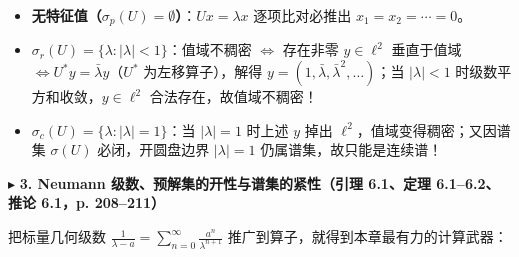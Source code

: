 \documentclass[11pt,a4paper]{article}
\providecommand{\tightlist}{\setlength{\itemsep}{1.8pt}\setlength{\parskip}{0pt}}
\newcommand{\SubSubHeading}[1]{%
  \Needspace{6.5\baselineskip}\vspace{5.5pt}\noindent
  \textcolor{AccentMain}{\scriptsize$\blacktriangleright$}\hspace{4pt}%
  {\small\bfseries\color{AccentMain}#1}\par\nopagebreak[4]\vspace{2.5pt}%
}
\begin{document}
\begin{enumerate}
  \begin{itemize}
  \tightlist
  \item
    \textbf{无特征值（\(\sigma_p(U)=\emptyset\)）}：\(Ux=\lambda x\) 逐项比对必推出 \(x_1 = x_2 = \cdots = 0\)。
  \item
    \textbf{\(\sigma_r(U) = \{\lambda : \lvert\lambda\rvert < 1\}\)}：值域不稠密 \(\iff\) 存在非零 \(y \in \ell^2\) 垂直于值域 \(\iff U^*y = \bar{\lambda}y\)（\(U^*\) 为左移算子），解得 \(y = (1, \bar{\lambda}, \bar{\lambda}^2, \dots)\)；当 \(\lvert\lambda\rvert < 1\) 时级数平方和收敛，\(y \in \ell^2\) 合法存在，故值域不稠密！
  \item
    \textbf{\(\sigma_c(U) = \{\lambda : \lvert\lambda\rvert = 1\}\)}：当 \(\lvert\lambda\rvert = 1\) 时上述 \(y\) 掉出 \(\ell^2\)，值域变得稠密；又因谱集 \(\sigma(U)\) 必闭，开圆盘边界 \(\lvert\lambda\rvert = 1\) 仍属谱集，故只能是连续谱！
  \end{itemize}
\end{enumerate}

\SubSubHeading{3. Neumann 级数、预解集的开性与谱集的紧性（引理 6.1、定理 6.1--6.2、推论 6.1，p. 208--211）}

把标量几何级数 \(\frac{1}{\lambda - a} = \sum_{n=0}^\infty \frac{a^n}{\lambda^{n+1}}\) 推广到算子，就得到本章最有力的计算武器：
\end{document}
